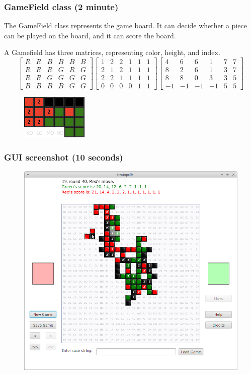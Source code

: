 \documentclass{beamer}
\begin{document}
\begin{frame}
\frametitle{GameField class (2 minute)}
The GameField class represents the game board. It can decide whether a piece can be played on the board, and it can score the board.

A Gamefield has three matrices, representing color, height, and index.
\tiny\[
  \begin{bmatrix}
    R & R & B & B & B & B \\ 
    R & R & R & G & R & G \\ 
    R & R & G & G & G & G \\ 
    B & B & B & B & G & G
  \end{bmatrix}
  \begin{bmatrix}
    1 & 2 & 2 & 1 & 1 & 1 \\ 
    2 & 1 & 2 & 1 & 1 & 1 \\ 
    2 & 2 & 1 & 1 & 1 & 1 \\ 
    0 & 0 & 0 & 0 & 1 & 1
  \end{bmatrix}
  \begin{bmatrix}
     4 &  6 &  6 &  1 &  7 &  7 \\ 
     8 &  2 &  6 &  1 &  3 &  7 \\ 
     8 &  8 &  0 &  3 &  3 &  5 \\ 
    -1 & -1 & -1 & -1 &  5 &  5
  \end{bmatrix}
\]
\begin{figure}
\includegraphics[width=0.4\linewidth]{8}
\end{figure}
\end{frame}

\begin{frame}
\frametitle{GUI screenshot (10 seconds)}
\begin{figure}
\includegraphics[width=0.7\linewidth]{gui_screenshot}
\end{figure}
\end{frame}
\end{document}
